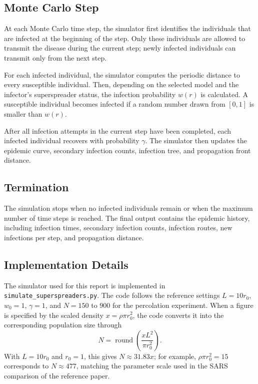 \documentclass[11pt,a4paper]{article}
\begin{document}
\subsection{Monte Carlo Step}

At each Monte Carlo time step, the simulator first identifies the individuals that are infected at the beginning of the step. Only these individuals are allowed to transmit the disease during the current step; newly infected individuals can transmit only from the next step.

For each infected individual, the simulator computes the periodic distance to every susceptible individual. Then, depending on the selected model and the infector's superspreader status, the infection probability $w(r)$ is calculated. A susceptible individual becomes infected if a random number drawn from $[0,1]$ is smaller than $w(r)$.

After all infection attempts in the current step have been completed, each infected individual recovers with probability $\gamma$. The simulator then updates the epidemic curve, secondary infection counts, infection tree, and propagation front distance.

\subsection{Termination}

The simulation stops when no infected individuals remain or when the maximum number of time steps is reached. The final output contains the epidemic history, including infection times, secondary infection counts, infection routes, new infections per step, and propagation distance.

\subsection{Implementation Details}

The simulator used for this report is implemented in \texttt{simulate\_superspreaders.py}. The code follows the reference settings $L=10r_0$, $w_0=1$, $\gamma=1$, and $N=150$ to $900$ for the percolation experiment. When a figure is specified by the scaled density $x=\rho\pi r_0^2$, the code converts it into the corresponding population size through
\begin{equation}
    N = \operatorname{round}\left(\frac{xL^2}{\pi r_0^2}\right).
\end{equation}
With $L=10r_0$ and $r_0=1$, this gives $N\approx 31.83x$; for example, $\rho\pi r_0^2=15$ corresponds to $N\approx 477$, matching the parameter scale used in the SARS comparison of the reference paper.
\end{document}
